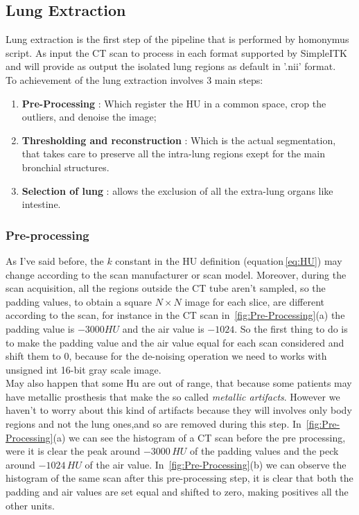 \documentclass{standalone}
\begin{document}
	\subsection{Lung Extraction}
	
	Lung extraction is the first step of the pipeline that is performed by homonymus script. As input the CT scan to process in each format supported by SimpleITK and will provide as output the isolated lung regions as default in '.nii' format.\\
	To achievement of the lung extraction involves 3 main steps: 
	  
	\begin{enumerate}
		\item \textbf{Pre-Processing} :  Which register the HU in a common space, crop the outliers, and denoise the image;
		
		\item \textbf{Thresholding and reconstruction} : Which is the actual segmentation, that takes care to preserve all the intra-lung regions exept for the main bronchial structures.
		
		\item \textbf{Selection of lung} : allows the exclusion of all the extra-lung organs like intestine.
	\end{enumerate}

	
	\subsubsection{Pre-processing} 
	
	As I've said before, the $k$ constant in the HU definition (equation\,\ref{eq:HU}) may change according to the scan manufacturer or scan model. Moreover, during the scan acquisition, all the regions outside the CT tube aren't sampled, so the padding values, to obtain a square $N\times N$ image for each slice, are different according to the scan, for instance in the CT scan in \figurename\,\ref{fig:Pre-Processing}(a) the padding value is $-3000 HU$ and the air value is $-1024$. So the first thing to do is to make the padding value and the air value equal for each scan considered and shift them to $0$, because for the de-noising operation we need to works with unsigned int 16-bit gray scale image.\\
	May also happen that some Hu are out of range, that because some patients may have metallic prosthesis that make the so called \textit{metallic artifacts}. However we haven't to worry about this kind of artifacts because they will involves only body regions and not the lung ones,and so are removed during this step.
	In \figurename\,\ref{fig:Pre-Processing}(a) we can see the histogram of a CT scan before the pre processing, were it is clear the peak around $-3000\,HU$ of the padding values and the peck around $-1024\,HU$ of the air value. In \figurename\,\ref{fig:Pre-Processing}(b) we can observe the histogram of the same scan after this pre-processing step, it is clear that both the padding and air values are set equal and shifted to zero, making positives all the other units.
	
\end{document}
